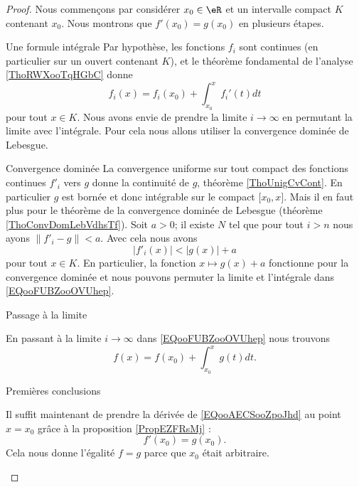 \begin{proof}
    Nous commençons par considérer \( x_0\in \eR\) et un intervalle compact \( K\) contenant \( x_0\). Nous montrons que \( f'(x_0)=g(x_0)\) en plusieurs étapes.
    \begin{subproof}
    \item[Une formule intégrale]
    Par hypothèse, les fonctions \( f_i\) sont continues (en particulier sur un ouvert contenant \( K\)), et le théorème fondamental de l'analyse \ref{ThoRWXooTqHGbC} donne
    \begin{equation}        \label{EQooFUBZooOVUhep}
        f_i(x)=f_i(x_0)+\int_{x_0}^xf_i'(t)dt
    \end{equation}
    pour tout \( x\in K\). Nous avons envie de prendre la limite \( i\to \infty\) en permutant la limite avec l'intégrale. Pour cela nous allons utiliser la convergence dominée de Lebesgue.

\item[Convergence dominée]
    La convergence uniforme sur tout compact des fonctions continues \( f'_i\) vers \( g\) donne la continuité de \( g\), théorème \ref{ThoUnigCvCont}. En particulier \( g\) est bornée et donc intégrable sur le compact \( \mathopen[ x_0 , x \mathclose]\). Mais il en faut plus pour le théorème de la convergence dominée de Lebesgue (théorème \ref{ThoConvDomLebVdhsTf}). Soit \( a>0\); il existe \( N\) tel que pour tout \( i>n\) nous ayons \( \| f'_i-g \|<a\). Avec cela nous avons
    \begin{equation}
        | f'_i(x) |<| g(x) |+a
    \end{equation}
    pour tout \( x\in K\). En particulier, la fonction \( x\mapsto g(x)+a\) fonctionne pour la convergence dominée et nous pouvons permuter la limite et l'intégrale dans \eqref{EQooFUBZooOVUhep}.

\item[Passage à la limite]

    En passant à la limite \( i\to \infty\) dans \eqref{EQooFUBZooOVUhep} nous trouvons
    \begin{equation}        \label{EQooAECSooZpoJhd}
        f(x)=f(x_0)+\int_{x_0}^xg(t)dt.
    \end{equation}
\item[Premières conclusions]

    Il suffit maintenant de prendre la dérivée de \eqref{EQooAECSooZpoJhd} au point \( x=x_0\) grâce à la proposition \ref{PropEZFRsMj} :
    \begin{equation}
        f'(x_0)=g(x_0).
    \end{equation}
    Cela nous donne l'égalité \( f=g\) parce que \( x_0\) était arbitraire.


\end{subproof}
\end{proof}
